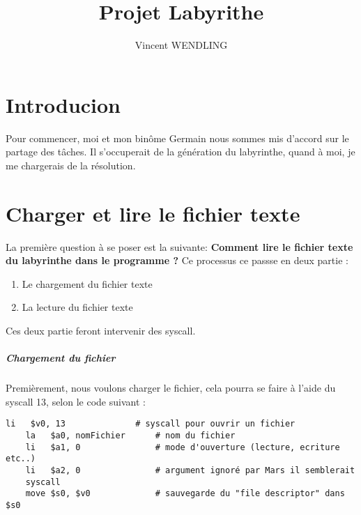 \documentclass{report}
\author{Vincent WENDLING}
\title{Projet Labyrithe}
\begin{document}
\chapter{Introducion}
Pour commencer, moi et mon binôme Germain nous sommes mis d'accord sur le partage des tâches. Il s'occuperait de la génération du labyrinthe, quand à moi, je me chargerais de la résolution. 


\chapter{Charger et lire le fichier texte}
La première question à se poser est la suivante: \textbf{Comment lire le fichier texte du labyrinthe dans le programme ?}
\newline
\newline
Ce processus ce passse en deux partie : 

\begin{enumerate}
	\item Le chargement du fichier texte
	\item La lecture du fichier texte
\end{enumerate}


Ces deux partie feront intervenir des syscall.

\paragraph{Chargement du fichier} 
Premièrement, nous voulons charger le fichier, cela pourra se faire à l'aide du syscall 13, selon le code suivant :
\begin{lstlisting}[language={[mips]Assembler}]
	li   $v0, 13       		  # syscall pour ouvrir un fichier
	la   $a0, nomFichier      # nom du fichier
	li   $a1, 0               # mode d'ouverture (lecture, ecriture etc..)
	li   $a2, 0               # argument ignoré par Mars il semblerait
	syscall                   
	move $s0, $v0             # sauvegarde du "file descriptor" dans $s0 
\end{lstlisting}
\end{document}
